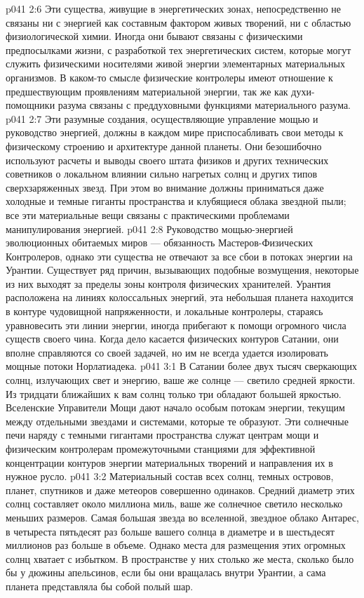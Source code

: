 \vs p041 2:6 \pc Эти существа, живущие в энергетических зонах, непосредственно не связаны ни с энергией как составным фактором живых творений, ни с областью физиологической химии. Иногда они бывают связаны с физическими предпосылками жизни, с разработкой тех энергетических систем, которые могут служить физическими носителями живой энергии элементарных материальных организмов. В каком\hyp{}то смысле физические контролеры имеют отношение к предшествующим проявлениям материальной энергии, так же как духи\hyp{}помощники разума связаны с преддуховными функциями материального разума.
\vs p041 2:7 \pc Эти разумные создания, осуществляющие управление мощью и руководство энергией, должны в каждом мире приспосабливать свои методы к физическому строению и архитектуре данной планеты. Они безошибочно используют расчеты и выводы своего штата физиков и других технических советников о локальном влиянии сильно нагретых солнц и других типов сверхзаряженных звезд. При этом во внимание должны приниматься даже холодные и темные гиганты пространства и клубящиеся облака звездной пыли; все эти материальные вещи связаны с практическими проблемами манипулирования энергией.
\vs p041 2:8 Руководство мощью\hyp{}энергией эволюционных обитаемых миров --- обязанность Мастеров\hyp{}Физических Контролеров, однако эти существа не отвечают за все сбои в потоках энергии на Урантии. Существует ряд причин, вызывающих подобные возмущения, некоторые из них выходят за пределы зоны контроля физических хранителей. Урантия расположена на линиях колоссальных энергий, эта небольшая планета находится в контуре чудовищной напряженности, и локальные контролеры, стараясь уравновесить эти линии энергии, иногда прибегают к помощи огромного числа существ своего чина. Когда дело касается физических контуров Сатании, они вполне справляются со своей задачей, но им не всегда удается изолировать мощные потоки Норлатиадека.
\vs p041 3:1 В Сатании более двух тысяч сверкающих солнц, излучающих свет и энергию, ваше же солнце --- светило средней яркости. Из тридцати ближайших к вам солнц только три обладают большей яркостью. Вселенские Управители Мощи дают начало особым потокам энергии, текущим между отдельными звездами и системами, которые те образуют. Эти солнечные печи наряду с темными гигантами пространства служат центрам мощи и физическим контролерам промежуточными станциями для эффективной концентрации контуров энергии материальных творений и направления их в нужное русло.
\vs p041 3:2 Материальный состав всех солнц, темных островов, планет, спутников и даже метеоров совершенно одинаков. Средний диаметр этих солнц составляет около миллиона миль, ваше же солнечное светило несколько меньших размеров. Самая большая звезда во вселенной, звездное облако Антарес, в четыреста пятьдесят раз больше вашего солнца в диаметре и в шестьдесят миллионов раз больше в объеме. Однако места для размещения этих огромных солнц хватает с избытком. В пространстве у них столько же места, сколько было бы у дюжины апельсинов, если бы они вращалась внутри Урантии, а сама планета представляла бы собой полый шар.

